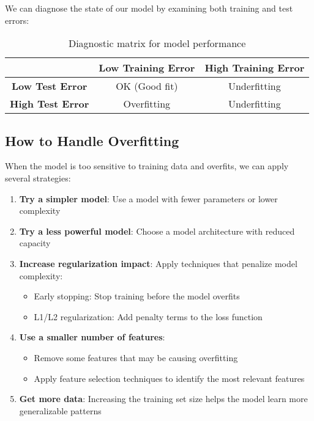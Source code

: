 \documentclass[11pt,a4paper]{article}
\theoremstyle{definition}
\theoremstyle{plain}
\theoremstyle{remark}
\begin{document}
We can diagnose the state of our model by examining both training and test errors:

\begin{table}[h]
\centering
\begin{tabular}{|c|c|c|}
\hline
 & \textbf{Low Training Error} & \textbf{High Training Error} \\
\hline
\textbf{Low Test Error} & OK (Good fit) & Underfitting \\
\hline
\textbf{High Test Error} & Overfitting & Underfitting \\
\hline
\end{tabular}
\caption{Diagnostic matrix for model performance}
\end{table}

\subsection{How to Handle Overfitting}

When the model is too sensitive to training data and overfits, we can apply several strategies:

\begin{enumerate}
    \item \textbf{Try a simpler model}: Use a model with fewer parameters or lower complexity
    
    \item \textbf{Try a less powerful model}: Choose a model architecture with reduced capacity
    
    \item \textbf{Increase regularization impact}: Apply techniques that penalize model complexity:
    \begin{itemize}
        \item Early stopping: Stop training before the model overfits
        \item L1/L2 regularization: Add penalty terms to the loss function
    \end{itemize}
    
    \item \textbf{Use a smaller number of features}:
    \begin{itemize}
        \item Remove some features that may be causing overfitting
        \item Apply feature selection techniques to identify the most relevant features
    \end{itemize}
    
    \item \textbf{Get more data}: Increasing the training set size helps the model learn more generalizable patterns
\end{enumerate}
\end{document}
